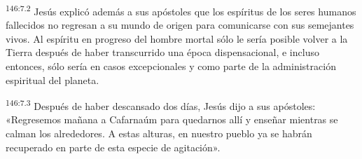 \par
\textsuperscript{146:7.2} Jesús explicó además a sus apóstoles que los espíritus de los seres humanos fallecidos no regresan a su mundo de origen para comunicarse con sus semejantes vivos. Al espíritu en progreso del hombre mortal sólo le sería posible volver a la Tierra después de haber transcurrido una época dispensacional, e incluso entonces, sólo sería en casos excepcionales y como parte de la administración espiritual del planeta.

\par
\textsuperscript{146:7.3} Después de haber descansado dos días, Jesús dijo a sus apóstoles: «Regresemos mañana a Cafarnaúm para quedarnos allí y enseñar mientras se calman los alrededores. A estas alturas, en nuestro pueblo ya se habrán recuperado en parte de esta especie de agitación».